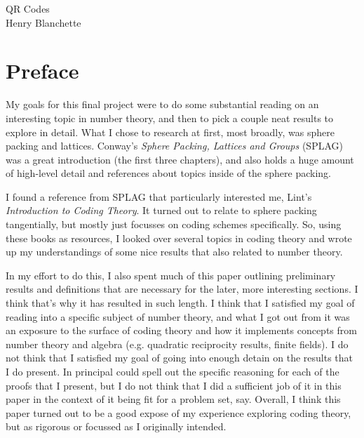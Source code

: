 \documentclass{article}
\renewcommand{\=}{\equiv}
\theoremstyle{plain}
\theoremstyle{definition}
\begin{document}

\vspace*{\fill}
\begin{center}
  \vspace{-300px}
  {\huge\sc QR Codes}
  \\[2em]
  {\large Henry Blanchette}
\end{center}
\vspace*{\fill}


\newpage
{}

\setcounter{section}{-1}
\section{Preface}

My goals for this final project were to do some substantial reading on an interesting topic in number theory, and then to pick a couple neat results to explore in detail. What I chose to research at first, most broadly, was sphere packing and lattices.
Conway's \textit{Sphere Packing, Lattices and Groups} (SPLAG) was a great introduction (the first three chapters), and also holds a huge amount of high-level detail and references about topics inside of the sphere packing.

I found a reference from SPLAG that particularly interested me, Lint's \textit{Introduction to Coding Theory}. It turned out to relate to sphere packing tangentially, but mostly just focusses on coding schemes specifically. So, using these books as resources, I looked over several topics in coding theory and wrote up my understandings of some nice results that also related to number theory.

In my effort to do this, I also spent much of this paper outlining preliminary results and definitions that are necessary for the later, more interesting sections. I think that's why it has resulted in such length.
I think that I satisfied my goal of reading into a specific subject of number theory, and what I got out from it was an exposure to the surface of coding theory and how it implements concepts from number theory and algebra (e.g. quadratic reciprocity results, finite fields).
I do not think that I satisfied my goal of going into enough detain on the results that I do present. In principal could spell out the specific reasoning for each of the proofs that I present, but I do not think that I did a sufficient job of it in this paper in the context of it being fit for a problem set, say.
Overall, I think this paper turned out to be a good expose of my experience exploring coding theory, but as rigorous or focussed as I originally intended.
\end{document}
